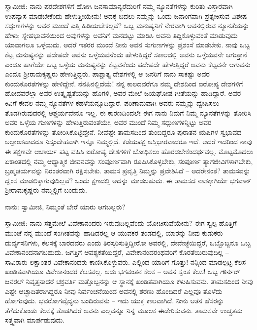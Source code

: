 ಸ್ವಾಮೀಜಿ: ನಾನು ಪರದೇಶಗಳಿಗೆ ಹೋಗಿ ಜನಸಾಮಾನ್ಯರೆದುರಿಗೆ ನಮ್ಮ ನ್ಯೂನತೆಗಳನ್ನು ಕುರಿತು ವಿಸ್ತಾರವಾಗಿ ಉಪನ್ಯಾಸ ಮಾಡಬೇಕೆಂದು ಹೇಳುತ್ತೀಯೇನು! ಅದಕ್ಕೆ ಬದಲು ನಮ್ಮನ್ನು ಒಂದು ಜನಾಂಗವಾಗಿ ಪ್ರತ್ಯೇಕಿಸುವ ವಿಶೇಷ ಸದ್ಗುಣಗಳನ್ನು ಅವರ ಮುಂದೆ ಎತ್ತಿ ಹಿಡಿಯಬೇಕಲ್ಲವೆ? ಒಬ್ಬ ಮನುಷ್ಯನಿಗೆ ನೇರವಾಗಿ ಅವನಲ್ಲಿರುವ ನ್ಯೂನತೆಯನ್ನು ಹೇಳು; ಸ್ನೇಹಭಾವನೆಯಿಂದ ಅವುಗಳನ್ನು ಅವನಿಗೆ ಮನದಟ್ಟು ಮಾಡಿಸಿ ಅವನು ತಿದ್ದಿಕೊಳ್ಳುವಂತೆ ಮಾಡುವುದು ಯಾವಾಗಲೂ ಒಳ್ಳೆಯದು. ಆದರೆ ಇತರರ ಮುಂದೆ ನೀನು ಅವನ ಸುಗುಣಗಳನ್ನು ಪ್ರಶಂಸೆ ಮಾಡಬೇಕು. ನಾವು ಒಬ್ಬ ಕೆಟ್ಟ ಮನುಷ್ಯನನ್ನು ಪದೇಪದೇ ಅವನು ಒಳ್ಳೆಯವನೆಂದು ಹೇಳುತ್ತಿದ್ದರೆ ಸಕಾಲದಲ್ಲಿ ಅವನು ಒಳ್ಳೆಯವನೇ ಆಗುತ್ತಾನೆ ಎಂದೂ ಹಾಗೆಯೇ ಒಬ್ಬ ಒಳ್ಳೆಯ ಮನುಷ್ಯನನ್ನು ಕೆಟ್ಟವನೆಂದು ಪದೇಪದೇ ಹೇಳುತ್ತಿದ್ದರೆ ಅವನು ಕೆಟ್ಟವನೇ ಆಗುವನು ಎಂದೂ ಶ‍್ರೀರಾಮಕೃಷ್ಣರು ಹೇಳುತ್ತಿದ್ದರು. ಪಾಶ್ಚಾತ್ಯ ದೇಶಗಳಲ್ಲಿ ಆ ಜನರಿಗೆ ನಾನು ಸಾಕಷ್ಟು ಅವರ ಕುಂದುಕೊರತೆಗಳನ್ನು ಹೇಳಿದ್ದೇನೆ. ನೆನಪಿನಲ್ಲಿದೆಯೆ! ನನ್ನ ಕಾಲದವರೆಗೂ ನಮ್ಮ ದೇಶದಿಂದ ಐರೋಪ್ಯ ದೇಶಗಳಿಗೆ ಹೋದವರೆಲ್ಲಾ ಅವರ ಉತ್ಕೃಷ್ಟತೆಯನ್ನು ಹೊಗಳಿ, ಅವರ ಮೇಲೆ ಜಯಘೋಷ ಗೀತೆಯನ್ನು ಹಾಡಿದ್ದಾರೆ. ಅವರ ಕಿವಿಗೆ ಕೇವಲ ನಮ್ಮ ನ್ಯೂನತೆಗಳ ಕಹಳೆಯನ್ನೂದಿದ್ದಾರೆ. ಪರಿಣಾಮವಾಗಿ ಅವರು ನಮ್ಮನ್ನು ದ್ವೇಷಿಸಲು ತೊಡಗಿರುವುದರಲ್ಲಿ ಆಶ್ಚರ್ಯವೇನೂ ಇಲ್ಲ. ಈ ಕಾರಣದಿಂದಲೇ ಈಗ ನಾನು ನಿಮಗೆ ನಿಮ್ಮ ನ್ಯೂನತೆಗಳನ್ನು ತೋರಿಸಿ ಅವರ ಒಳ್ಳೆಯ ಗುಣಗಳನ್ನು ಹೇಳುತ್ತಿರುವಂತೆಯೇ, ಅವರ ಮುಂದೆ ನಿಮ್ಮ ಸದ್ಗುಣಗಳನ್ನಿಟ್ಟು ಅವರ ಕುಂದುಕೊರತೆಗಳನ್ನು ತೋರಿಸಿಕೊಟ್ಟಿದ್ದೇನೆ. ನೀವೆಷ್ಟೇ ತಾಮಸದಿಂದ ತುಂಬಿದ್ದರೂ ಪುರಾತನ ಋಷಿಗಳ ಸ್ವಭಾವದ ಅಲ್ಪಾಂಶವಾದರೂ ನಿಸ್ಸಂದೇಹವಾಗಿ ಇನ್ನೂ ನಿಮ್ಮಲ್ಲಿದೆ. ಕಡೆಯಪಕ್ಷ ಅಸ್ತಿಭಾರವಾದರೂ ಇದೆ. ಆದರೆ ಇದರಿಂದ ನಾವು ಈ ತಕ್ಷಣವೇ ಆಚಾರ್ಯ ಪಟ್ಟ ವಹಿಸಿ ಐರೋಪ್ಯ ದೇಶಗಳಿಗೆ ಬೋಧಿಸಲು ಹೊರಡಬೇಕೆಂದರ್ಥವಲ್ಲ. ಮೊಟ್ಟಮೊದಲು ಏಕಾಂತದಲ್ಲಿ ನಮ್ಮ ಆಧ್ಯಾತ್ಮಿಕ ಜೀವನವನ್ನು ಸಂಪೂರ್ಣವಾಗಿ ರೂಪಿಸಿಕೊಳ್ಳಬೇಕು, ಸಂಪೂರ್ಣ ತ್ಯಾಗಜೀವಿಗಳಾಗಬೇಕು, ಬ್ರಹ್ಮಚರ್ಯವನ್ನು ನಿರಂತರವಾಗಿ ರಕ್ಷಿಸಬೇಕು. ತಾಮಸ ಪ್ರವೃತ್ತಿ ನಿಮ್ಮನ್ನು ಪ್ರವೇಶಿಸಿದೆ – ಆದರೇನಂತೆ? ತಾಮಸವನ್ನು ಧ್ವಂಸ ಮಾಡಲಿಕ್ಕಾಗುವುದಿಲ್ಲವೆ? ಒಂದು ಕ್ಷಣದಲ್ಲಿ ಅದನ್ನು ಮಾಡಬಹುದು. ಈ ತಾಮಸದ ನಾಶಕ್ಕಾಗಿಯೇ ಭಗವಾನ್ ಶ‍್ರೀರಾಮಕೃಷ್ಣರು ನಮ್ಮಲ್ಲಿಗೆ ಬಂದುದು.

ನಾನು: ಸ್ವಾಮೀಜಿ, ನಿಮ್ಮಂತೆ ಬೇರೆ ಯಾರು ಆಗಬಲ್ಲರು?

ಸ್ವಾಮೀಜಿ: ನಾನು ಸತ್ತಮೇಲೆ ವಿವೇಕಾನಂದರು ಇರುವುದಿಲ್ಲವೆಂದು ಯೋಚಿಸುವೆಯೇನು? ಈಗ ಸ್ವಲ್ಪ ಹೊತ್ತಿಗೆ ಮುಂಚೆ ನನ್ನ ಮುಂದೆ ಸಂಗೀತವನ್ನು ಹಾಡಿದರಲ್ಲ ಆ ಯುವಕರ ತಂಡದಲ್ಲಿ, ಯಾರನ್ನು ನೀವು ಕುಡುಕರು ದುರ್ವ್ಯಸನಿಗಳು, ಕೆಲಸಕ್ಕೆ ಬಾರದವರು ಎಂದು ತಿರಸ್ಕರಿಸುತ್ತಿದ್ದೀರೋ ಅವರಲ್ಲಿ, ದೇವೇಚ್ಛೆಯಿದ್ದರೆ, ಒಬ್ಬೊಬ್ಬನೂ ಒಬ್ಬ ವಿವೇಕಾನಂದನಾಗಬಹುದು. ಜಗತ್ತಿಗೆ ಆವಶ್ಯಕತೆಯಿದ್ದರೆ, ವಿವೇಕಾನಂದರಂಥವರಿಗೆ ಕೊರತೆಯಿರುವುದಿಲ್ಲ – ಸಾವಿರಾರು ಲಕ್ಷಾಂತರ ವಿವೇಕಾನಂದರು ಕಾಣಿಸಿಕೊಳ್ಳುವರು. ಎಲ್ಲಿಂದ ಯಾರಿಗೆ ಗೊತ್ತು! ನನ್ನಿಂದ ಮಾಡಲ್ಪಟ್ಟ ಕೆಲಸ ಖಂಡಿತವಾಗಿಯೂ ವಿವೇಕಾನಂದರ ಕೆಲಸವಲ್ಲ. ಅದು ಭಗವಂತನ ಕೆಲಸ – ಅವನ ಸ್ವಂತ ಕೆಲಸ! ಒಬ್ಬ ಗೌರ್ನರ್ ಜನರಲ್ ನಿವೃತ್ತನಾದರೆ ಚಕ್ರವರ್ತಿ ಮತ್ತೊಬ್ಬನನ್ನು ಆ ಸ್ಥಾನಕ್ಕೆ ಖಂಡಿತವಾಗಿಯೂ ಕಳುಹಿಸುವನು. ತಾಮಸದಿಂದ ನೀವು ಎಷ್ಟೇ ಆಚ್ಛಾದಿತರಾಗಿದ್ದರೂ ನೀವು ನಿರ್ವಂಚನೆಯಿಂದ ಅವನಲ್ಲಿ ಶರಣು ಹೊಂದಿದರೆ ಎಲ್ಲವೂ ತೊಳೆದು ಹೋಗುವುದು. ಭವರೋಗವೈದ್ಯನು ಬಂದಿರುವನು – ಇದು ಯುಕ್ತ ಕಾಲವಾಗಿದೆ. ನೀನು ಆತನ ಹೆಸರನ್ನು ತೆಗೆದುಕೊಂಡು ಕೆಲಸಕ್ಕೆ ತೊಡಗಿದರೆ ಅವನು ಎಲ್ಲವನ್ನೂ ನಿನ್ನ ಮೂಲಕ ಈಡೇರಿಸುವನು. ತಾಮಸವೇ ಉಚ್ಚತಮ ಸತ್ತ್ವವಾಗಿ ಮಾರ್ಪಡುವುದು.


